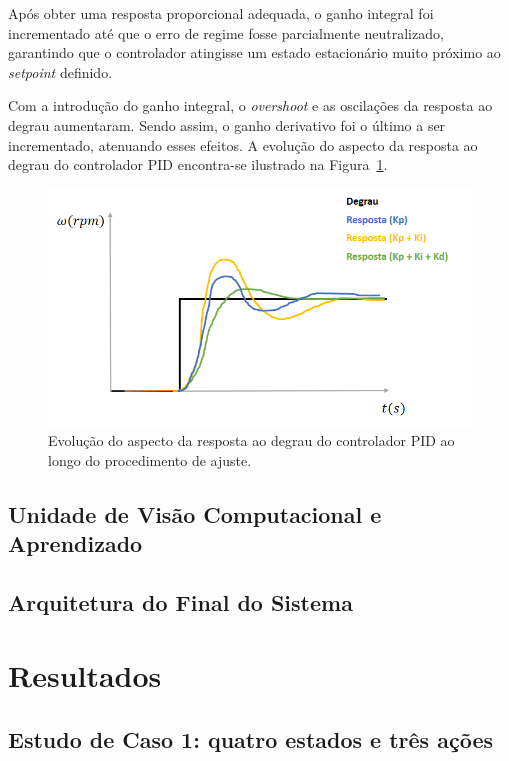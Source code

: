 \documentclass[a4paper]{ifacconf}
\begin{document}
Após obter uma resposta proporcional adequada, o ganho integral foi incrementado até que o erro de regime fosse parcialmente neutralizado, garantindo que o controlador atingisse um estado estacionário muito próximo ao \textit{setpoint} definido. 

Com a introdução do ganho integral, o \textit{overshoot} e as oscilações da resposta ao degrau aumentaram. Sendo assim, o ganho derivativo foi o último a ser incrementado, atenuando esses efeitos. A evolução do aspecto da resposta ao degrau do controlador PID encontra-se ilustrado na Figura~\ref{fig:adjustEvolve}.

\begin{figure}
\begin{center}
\includegraphics[scale=0.45]{Figuras/adjustEvolve.png}
\caption{Evolução do aspecto da resposta ao degrau do controlador PID ao longo do procedimento de ajuste.}  
\label{fig:adjustEvolve}
\end{center}
\end{figure}

\subsection{Unidade de Visão Computacional e Aprendizado}

\subsection{Arquitetura do Final do Sistema}

\section{Resultados}
\subsection{Estudo de Caso 1: quatro estados e três ações}
\end{document}
